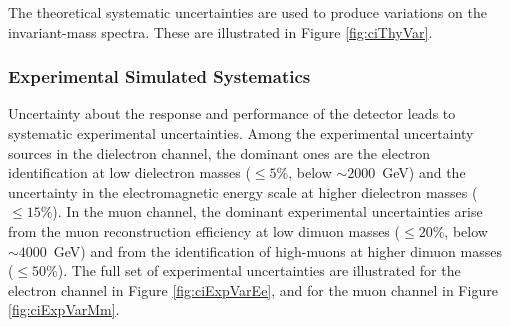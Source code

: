 The theoretical systematic uncertainties are used to produce variations on the invariant-mass spectra.
These are illustrated in Figure \ref{fig:ciThyVar}.



\subsubsection{Experimental Simulated Systematics}\label{sec:ciExpSyst}

Uncertainty about the response and performance of the detector leads to systematic experimental uncertainties.
Among the experimental uncertainty sources in the dielectron channel, the dominant ones are the electron identification at low dielectron masses ($\leq 5\%$, below $\sim2000$~GeV) and the uncertainty in the electromagnetic energy scale at higher dielectron masses ($\leq 15\%$).
In the muon channel, the dominant experimental uncertainties arise from the muon reconstruction efficiency at low dimuon masses ($\leq 20\%$, below $\sim4000$~GeV) and from the identification of high-\pt muons at higher dimuon masses ($\leq 50\%$).
The full set of experimental uncertainties are illustrated for the electron channel in Figure \ref{fig:ciExpVarEe}, and for the muon channel in Figure \ref{fig:ciExpVarMm}.

